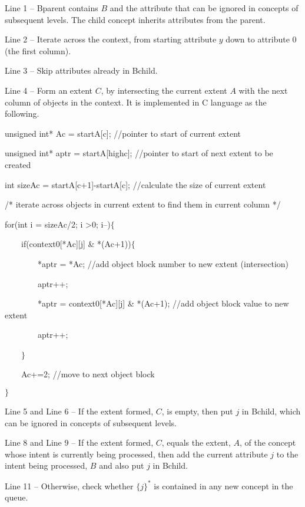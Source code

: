 \documentclass[11pt]{article}
\numberwithin{equation}{subsection}
\begin{document}

Line 1 -- Bparent contains $B$ and the attribute that
  can be ignored in concepts of subsequent levels. The child concept inherits attributes from the parent.

Line 2 -- Iterate across the context, from starting attribute $y$ down to attribute 0 (the first column).

Line 3 -- Skip attributes already in Bchild.

Line 4 -- Form an extent $C$, by intersecting the current extent $A$ with the next column of objects in the context.
It is implemented in C language as the following.

unsigned 	int* Ac = startA[c];						//pointer to start of current extent

unsigned 	int* aptr = startA[highc];					//pointer to start of next extent to be created

			int sizeAc = startA[c+1]-startA[c];			//calculate the size of current extent

			/* iterate across objects in current extent to find them in current  column */

			for(int i = sizeAc/2; i \textgreater  0; i--)$\{$

			\ \ \ \	 if(context0[*Ac][j] \& *(Ac+1))$\{$

			\ \ \ \	 \ \ \ \			*aptr = *Ac;						//add object block number to new extent (intersection)

			\ \ \ \	\ \ \ \			aptr++;

			\ \ \ \	\ \ \ \			*aptr = context0[*Ac][j] \& *(Ac+1);       //add object block value to new extent

			\ \ \ \	\ \ \ \			aptr++;

			\ \ \ \		$\}$

			\ \ \ \		Ac+=2;									//move to next object block

			 $\}$




Line 5 and Line 6 -- If the extent formed, $C$, is empty, then put $j$ in  Bchild, which can be ignored in  concepts of subsequent levels.

Line 8 and Line 9 -- If the extent formed, $C$, equals the extent, $A$, of the concept whose intent is currently being processed, then  add the current attribute $j$ to the intent being processed, $B$ and also put $j$ in  Bchild.

Line 11 -- Otherwise, check whether $\{j\}^*$ is contained in any new concept in the queue.
\end{document}
